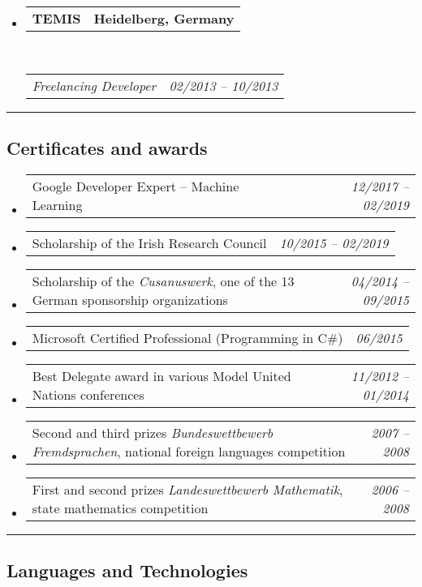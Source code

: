\documentclass[10pt,letterpaper]{article}
\makeatletter
\newcommand{\headerrow}[2]
{\begin{tabular*}{\linewidth}{l@{\extracolsep{\fill}}r}
	#1 &
	#2 \\
\end{tabular*}}
\makeatother
\begin{document}
\begin{itemize}
	\item
	\headerrow
		{\textbf{TEMIS}}
		{\textbf{Heidelberg, Germany}}
	\\
	\headerrow
		{\emph{Freelancing Developer}}
		{\emph{02/2013 -- 10/2013}}

\end{itemize}


\hrule
\vspace{-0.4em}
\subsection*{Certificates and awards}

\begin{itemize}
	\parskip=0.1em
	
	\item 
	\headerrow
		{Google Developer Expert -- Machine Learning}
		{\emph{12/2017 -- 02/2019}}
	\item 
	\headerrow
		{Scholarship of the Irish Research Council}
		{\emph{10/2015 -- 02/2019}}
	\item 
	\headerrow
		{Scholarship of the \emph{Cusanuswerk}, one of the 13 German sponsorship organizations}
		{\emph{04/2014 -- 09/2015}}	
	\item 
	\headerrow
		{Microsoft Certified Professional (Programming in C\#)}
		{\emph{06/2015}}
	\item 
	\headerrow
		{Best Delegate award in various Model United Nations conferences}
		{\emph{11/2012 -- 01/2014}}
	\item 
	\headerrow
		{Second and third prizes \emph{Bundeswettbewerb Fremdsprachen}, national foreign languages competition}
		{\emph{2007 -- 2008}}
	\item 
	\headerrow
		{First and second prizes \emph{Landeswettbewerb Mathematik}, state mathematics competition}
		{\emph{2006 -- 2008}}
	

\end{itemize}

\hrule
\vspace{-0.4em}
\subsection*{Languages and Technologies}
\end{document}
